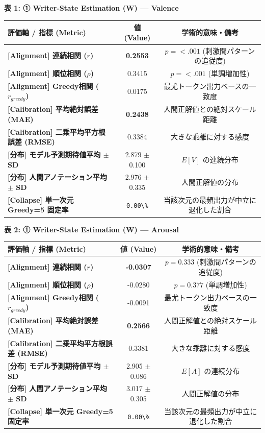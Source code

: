 \textbf{表 1: ① Writer-State Estimation (W) — Valence}
\begin{center}
\small
\begin{tabular}{lcc}
\toprule
\textbf{評価軸 / 指標 (Metric)} & \textbf{値 (Value)} & \textbf{学術的意味・備考} \\
\midrule
\textbf{[Alignment] 連続相関 ($r$)} & \textbf{0.2553} & $p = <.001 $ (刺激間パターンの追従度) \\
\textbf{[Alignment] 順位相関 ($\rho$)} & 0.3415 & $p = <.001 $ (単調増加性) \\
\textbf{[Alignment] Greedy相関 ($r_{greedy}$)} & 0.0175 & 最尤トークン出力ベースの一致度 \\
\textbf{[Calibration] 平均絶対誤差 (MAE)} & \textbf{0.2438} & 人間正解値との絶対スケール距離 \\
\textbf{[Calibration] 二乗平均平方根誤差 (RMSE)} & 0.3384 & 大きな乖離に対する感度 \\
\textbf{[分布] モデル予測期待値平均 $\pm$ SD} & 2.879 $\pm$ 0.100 & $E[V]$ の連続分布 \\
\textbf{[分布] 人間アノテーション平均 $\pm$ SD} & 2.976 $\pm$ 0.335 & 人間正解値の分布 \\
\textbf{[Collapse] 単一次元 Greedy=5 固定率} & \texttt{0.00\textbackslash{}\%} & 当該次元の最頻出力が中立に退化した割合 \\
\bottomrule
\end{tabular}
\end{center}


\textbf{表 2: ① Writer-State Estimation (W) — Arousal}
\begin{center}
\small
\begin{tabular}{lcc}
\toprule
\textbf{評価軸 / 指標 (Metric)} & \textbf{値 (Value)} & \textbf{学術的意味・備考} \\
\midrule
\textbf{[Alignment] 連続相関 ($r$)} & \textbf{-0.0307} & $p = 0.333 $ (刺激間パターンの追従度) \\
\textbf{[Alignment] 順位相関 ($\rho$)} & -0.0280 & $p = 0.377 $ (単調増加性) \\
\textbf{[Alignment] Greedy相関 ($r_{greedy}$)} & -0.0091 & 最尤トークン出力ベースの一致度 \\
\textbf{[Calibration] 平均絶対誤差 (MAE)} & \textbf{0.2566} & 人間正解値との絶対スケール距離 \\
\textbf{[Calibration] 二乗平均平方根誤差 (RMSE)} & 0.3381 & 大きな乖離に対する感度 \\
\textbf{[分布] モデル予測期待値平均 $\pm$ SD} & 2.905 $\pm$ 0.086 & $E[A]$ の連続分布 \\
\textbf{[分布] 人間アノテーション平均 $\pm$ SD} & 3.017 $\pm$ 0.305 & 人間正解値の分布 \\
\textbf{[Collapse] 単一次元 Greedy=5 固定率} & \texttt{0.00\textbackslash{}\%} & 当該次元の最頻出力が中立に退化した割合 \\
\bottomrule
\end{tabular}
\end{center}


